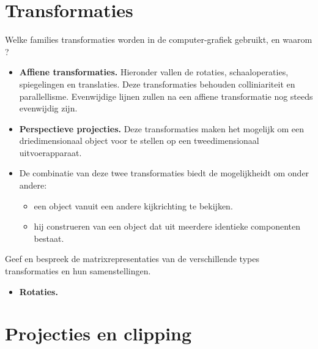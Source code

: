 \documentclass{report}
\begin{document}
	\section{Transformaties}
	\begin{enumerate}
	\vraag
	{
		Welke families transformaties worden in de computer-grafiek gebruikt, en waarom ?
	}
	{
		\begin{itemize}
			\item \textbf{Affiene transformaties.} Hieronder vallen de rotaties, schaaloperaties, spiegelingen en translaties. Deze transformaties behouden colliniariteit en parallellisme. Evenwijdige lijnen zullen na een affiene transformatie nog steeds evenwijdig zijn. 
			
			\item \textbf{Perspectieve projecties.} Deze transformaties maken het mogelijk om een driedimensionaal object voor te stellen op een tweedimensionaal uitvoerapparaat.
			
			\item De combinatie van deze twee transformaties biedt de mogelijkheidt om onder andere:
			\begin{itemize}
				\item een object vanuit een andere kijkrichting te bekijken.
				\item hij construeren van een object dat uit meerdere identieke componenten bestaat. 
			\end{itemize}
		\end{itemize}	
	}
	
	\vraag 
	{
		Geef en bespreek de matrixrepresentaties van de verschillende types transformaties en hun samenstellingen. 	
	}
	{
		\begin{itemize}
			\item \textbf{Rotaties.} 
		\end{itemize}
	}
	\end{enumerate}

	\section{Projecties en clipping}
\end{document}
